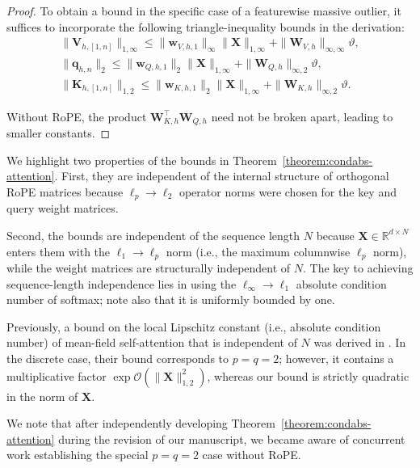 \documentclass[namedate,webpdf,imanum]{ima-authoring-template}
\newcommand{\Real}{\mathbb{R}}
\newcommand{\Matrix}[1]{\mathbf{#1}}
\newcommand{\trans}{\intercal}
\newcommand{\Norm}[3][]{#1\| #2 #1\|_{\mathrm{#3}}}
\newcommand{\Oh}[2][]{\mathcal{O}#1( #2 #1)}
\numberwithin{equation}{section}
\begin{document}
\begin{proof}
To obtain a bound in the specific case of a featurewise massive outlier, it suffices to incorporate the following triangle-inequality bounds in the derivation:
\begin{gather*}
    \Norm{\Matrix{V}_{h,[1,n]}}{1,\infty} \leq \Norm{\Matrix{w}_{V,h,1}}{\infty} \Norm{\Matrix{X}}{1,\infty} + \Norm{\Matrix{W}_{V,h}}{\infty,\infty} \vartheta, \\
    \Norm{\Matrix{q}_{h,n}}{2} \leq \Norm{\Matrix{w}_{Q,h,1}}{2} \Norm{\Matrix{X}}{1,\infty} + \Norm{\Matrix{W}_{Q,h}}{\infty,2} \vartheta, \\
    \Norm{\Matrix{K}_{h,[1,n]}}{1,2} \leq \Norm{\Matrix{w}_{K,h,1}}{2} \Norm{\Matrix{X}}{1,\infty} + \Norm{\Matrix{W}_{K,h}}{\infty,2} \vartheta.
\end{gather*}

Without RoPE, the product $\Matrix{W}_{K,h}^\trans \Matrix{W}_{Q,h}$ need not be broken apart, leading to smaller constants.
\end{proof}

We highlight two properties of the bounds in Theorem~\ref{theorem:condabs-attention}.
First, they are independent of the internal structure of orthogonal RoPE matrices because $\ell_p \to \ell_2$ operator norms were chosen for the key and query weight matrices.

Second, the bounds are independent of the sequence length $N$ because $\Matrix{X} \in \Real^{d \times N}$ enters them with the $\ell_1 \to \ell_p$ norm (i.e., the maximum columnwise $\ell_p$ norm), while the weight matrices are structurally independent of $N$.
The key to achieving sequence-length independence lies in using the $\ell_\infty \to \ell_1$ absolute condition number of softmax; note also that it is uniformly bounded by one.

Previously, a bound on the local Lipschitz constant (i.e., absolute condition number) of mean-field self-attention that is independent of $N$ was derived in \cite{castin2024smooth}.
In the discrete case, their bound corresponds to $p = q = 2$; however, it contains a multiplicative factor $\exp \Oh{\Norm{\Matrix{X}}{1,2}^2}$, whereas our bound is strictly quadratic in the norm of $\Matrix{X}$.

We note that after independently developing Theorem~\ref{theorem:condabs-attention} during the revision of our manuscript, we became aware of concurrent work \cite{emadi2026exact} establishing the special $p = q = 2$ case without RoPE.
\end{document}
